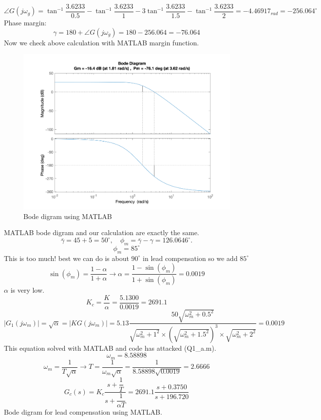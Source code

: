 $$
\angle G(j\omega_g) = \tan^{-1}\dfrac{3.6233}{0.5} - \tan^{-1}\dfrac{3.6233}{1} - 3\tan^{-1}\dfrac{3.6233}{1.5} - \tan^{-1}\dfrac{3.6233}{2} = -4.46917_{rad} = -256.064^{\circ}
$$
Phase margin:
$$
\gamma = 180 + \angle G(j\omega_g) = 180 - 256.064 = -76.064
$$
Now we check above calculation with MATLAB margin function.
\begin{figure}[H]
	\caption{Bode digram using MATLAB}
	\centering
	\includegraphics[width=12cm]{../Figure/Q1/a/margin.png}
\end{figure}
MATLAB bode digram and our calculation are exactly the same.
$$
\bar{\gamma} = 45 + 5 = 50^{\circ},\quad \phi_m = \bar{\gamma} - \gamma = 126.0646^{\circ}.
$$
$$
\phi_m = 85^{\circ}
$$
This is too much!
best we can do is about $90^{\circ}$ in lead compensation so we add $85^{\circ}$
$$
\sin(\phi_m) = \dfrac{1-\alpha}{1+\alpha} \to
\alpha = \dfrac{1-\sin(\phi_m) }{1+\sin(\phi_m) } = 0.0019
$$
$\alpha$ is very low.
$$
K_c = \dfrac{K}{\alpha} = \dfrac{5.1300}{0.0019} = 2691.1
$$
$$
\left\vert G_1(j\omega_m) \right\vert = \sqrt{\alpha} = \left\vert KG(j\omega_m) \right\vert = 5.13 \dfrac{50\sqrt{\omega_m^2+0.5^2}}{\sqrt{\omega_m^2+1^2}\times(\sqrt{\omega_m^2 + 1.5^2})^3\times\sqrt{\omega_m^2 + 2^2}} = 0.0019
$$
This equation solved with MATLAB and code has attacked (Q1\_a.m).
$$
\omega_m = 8.58898
$$
$$
\omega_m = \dfrac{1}{T\sqrt{\alpha}} \to
T = \dfrac{1}{\omega_m\sqrt{\alpha}} = \dfrac{1}{8.58898\sqrt{0.0019}} = 2.6666
$$
$$
G_c(s) = K_c \dfrac{s + \dfrac{1}{T}}{s + \dfrac{1}{\alpha T}} = 2691.1\dfrac{s + 0.3750}{s + 196.720}
$$
Bode digram for lead compensation using MATLAB.
